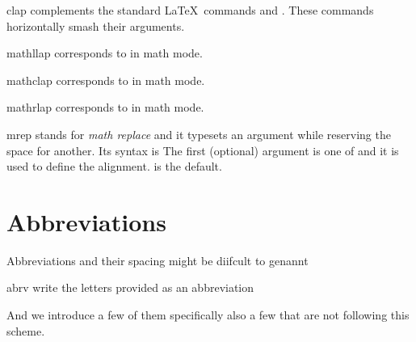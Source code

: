 \documentclass[english,a4paper,DIV=12,parskip=full,oneside]{scrartcl}
\begin{document}
    \begin{commandlist}
        \item[clap] complements the standard \LaTeX\ commands \codeCommand{\llap} and \codeCommand{\rlap}.
            These commands horizontally smash their arguments.
            \par{}
            \par{}
            \par{}
        \item[mathllap] corresponds to \codeCommand{\llap} in math mode.
            \par{}
        \item[mathclap] corresponds to \codeCommand{\clap} in math mode.
            \par{}
        \item[mathrlap] corresponds to \codeCommand{\rlap} in math mode.
            \par{}
        \item[mrep] stands for \emph{math replace} and it typesets an argument while reserving the space for another.
            Its syntax is 
            The first (optional) argument is one of  and it is used to define the alignment.
             is the default.
            \par{}
            \par{}
            \par{}
    \end{commandlist}

    \section{Abbreviations}
        Abbreviations and their spacing might be diifcult to genannt
        \begin{commandlist}
            \item[abrv] write the letters provided as an abbreviation
            \par{}
            \par{} %
        \end{commandlist}
        And we introduce a few of them specifically also a few that are not following this scheme.
        \label{sec:abbreviations}
\end{document}
